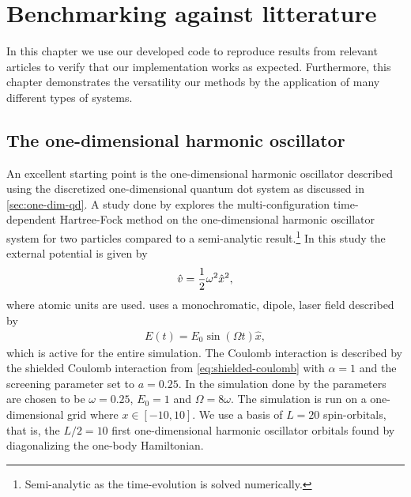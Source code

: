 \chapter{Benchmarking against litterature}
    In this chapter we use our developed code to reproduce results from relevant
    articles to verify that our implementation works as expected.
    Furthermore, this chapter demonstrates the versatility our methods by the
    application of many different types of systems.

    \section{The one-dimensional harmonic oscillator}
        An excellent starting point is the one-dimensional harmonic
        oscillator described using the discretized one-dimensional quantum dot
        system as discussed in \autoref{sec:one-dim-qd}.
        A study done by \citeauthor{zanghellini_2004}
        \cite{zanghellini_2004, skattum2013time, kristiansen2017time}
        explores the multi-configuration time-dependent Hartree-Fock method
        on the one-dimensional harmonic oscillator system for two particles
        compared to a semi-analytic result.\footnote{%
            Semi-analytic as the time-evolution is solved numerically.
        }
        In this study the external potential is given by
        \begin{align}
            \hat{v} = \frac{1}{2} \omega^2\hat{x}^2,
        \end{align}
        where atomic units are used.
        \citeauthor{zanghellini_2004} uses a monochromatic, dipole, laser field
        described by
        \begin{align}
            E(t) = E_0\sin(\Omega t)\hat{x},
        \end{align}
        which is active for the entire simulation.
        The Coulomb interaction is described by the shielded Coulomb interaction
        from \autoref{eq:shielded-coulomb} with $\alpha = 1$ and the screening
        parameter set to $a = 0.25$.
        In the simulation done by \citeauthor{zanghellini_2004} the parameters
        are chosen to be $\omega = 0.25$, $E_0 = 1$ and $\Omega =
        8\omega$.
        The simulation is run on a one-dimensional grid where $x \in [-10, 10]$.
        We use a basis of $L = 20$ spin-orbitals, that is, the $L / 2 = 10$
        first one-dimensional harmonic oscillator orbitals found by
        diagonalizing the one-body Hamiltonian.

